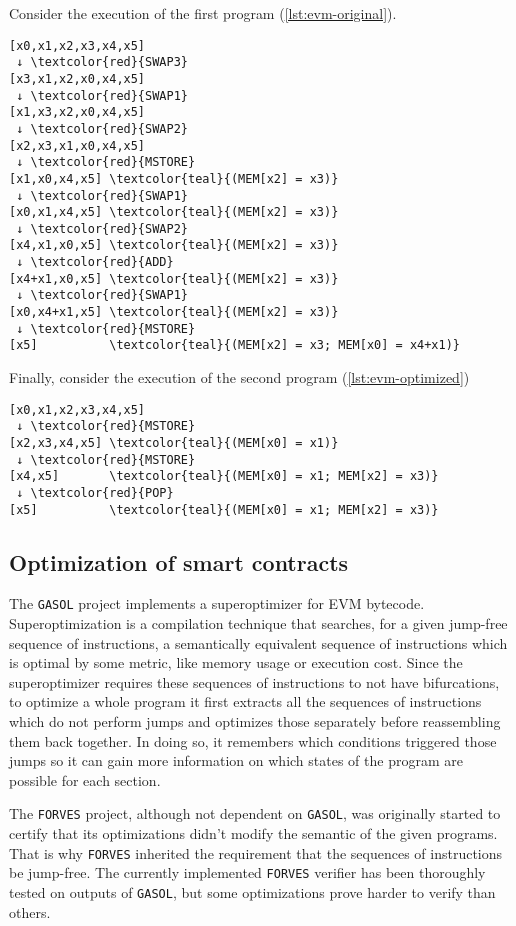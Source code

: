 Consider the execution of the first program (\ref{lst:evm-original}).

\begin{Verbatim}[commandchars=\\\{\}]
[x0,x1,x2,x3,x4,x5]
 ↓ \textcolor{red}{SWAP3}
[x3,x1,x2,x0,x4,x5]
 ↓ \textcolor{red}{SWAP1}
[x1,x3,x2,x0,x4,x5]
 ↓ \textcolor{red}{SWAP2}
[x2,x3,x1,x0,x4,x5]
 ↓ \textcolor{red}{MSTORE}
[x1,x0,x4,x5] \textcolor{teal}{(MEM[x2] = x3)}
 ↓ \textcolor{red}{SWAP1}
[x0,x1,x4,x5] \textcolor{teal}{(MEM[x2] = x3)}
 ↓ \textcolor{red}{SWAP2}
[x4,x1,x0,x5] \textcolor{teal}{(MEM[x2] = x3)}
 ↓ \textcolor{red}{ADD}
[x4+x1,x0,x5] \textcolor{teal}{(MEM[x2] = x3)}
 ↓ \textcolor{red}{SWAP1}
[x0,x4+x1,x5] \textcolor{teal}{(MEM[x2] = x3)}
 ↓ \textcolor{red}{MSTORE}
[x5]          \textcolor{teal}{(MEM[x2] = x3; MEM[x0] = x4+x1)}
\end{Verbatim}

Finally, consider the execution of the second program (\ref{lst:evm-optimized})

\begin{Verbatim}[commandchars=\\\{\}]
[x0,x1,x2,x3,x4,x5]
 ↓ \textcolor{red}{MSTORE}
[x2,x3,x4,x5] \textcolor{teal}{(MEM[x0] = x1)}
 ↓ \textcolor{red}{MSTORE}
[x4,x5]       \textcolor{teal}{(MEM[x0] = x1; MEM[x2] = x3)}
 ↓ \textcolor{red}{POP}
[x5]          \textcolor{teal}{(MEM[x0] = x1; MEM[x2] = x3)}
\end{Verbatim}

\subsection{Optimization of smart contracts}

The \verb|GASOL| project implements a superoptimizer for EVM bytecode. Superoptimization 
is a compilation technique that searches, for a given jump-free sequence of 
instructions, a semantically equivalent sequence of instructions which is optimal
by some metric, like memory usage or execution cost. Since the superoptimizer 
requires these sequences of instructions to not have bifurcations, to optimize a
whole program it first extracts all the sequences of instructions which do not perform
jumps and optimizes those separately before reassembling them back together. 
In doing so, it remembers which conditions triggered those jumps so it can gain more
information on which states of the program are possible for each section.

The \verb|FORVES| project, although not dependent on \verb|GASOL|, was originally started
to certify that its optimizations didn't modify the semantic of the given programs. That is
why \verb|FORVES| inherited the requirement that the sequences of instructions be jump-free.
The currently implemented \verb|FORVES| verifier has been thoroughly tested on outputs of
\verb|GASOL|, but some optimizations prove harder to verify than others. 

